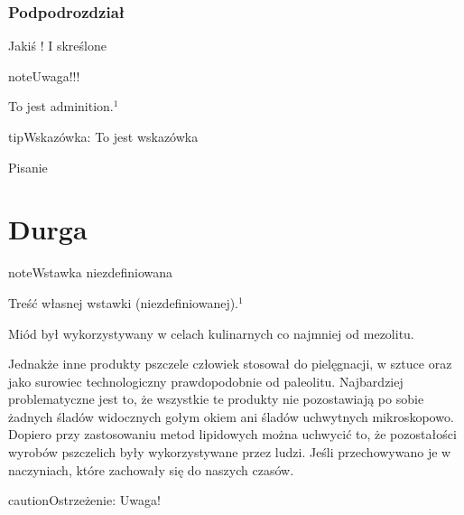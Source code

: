 \documentclass[letterpaper,10pt,polish]{sphinxmanual}
\let\sphinxpxdimen\pdfpxdimen\else\newdimen\sphinxpxdimen
\begin{document}
\subsection{Podpodrozdział}
\label{\detokenize{zrzut/index:podpodrozdzial}}
\sphinxAtStartPar
Jakiś ! I skreślone

\begin{sphinxadmonition}{note}{Uwaga!!!}

\sphinxAtStartPar
To jest adminition.$^{\text{1}}$
\end{sphinxadmonition}

\sphinxAtStartPar
{}

\begin{sphinxadmonition}{tip}{Wskazówka:}
\sphinxAtStartPar
To jest wskazówka
\end{sphinxadmonition}

\sphinxAtStartPar
Pisanie  


\chapter{Durga}
\label{\detokenize{zrzut/index:durga}}
\begin{sphinxadmonition}{note}{Wstawka niezdefiniowana}

\sphinxAtStartPar
Treść własnej wstawki (niezdefiniowanej).$^{\text{1}}$
\end{sphinxadmonition}

\sphinxAtStartPar
{}

\sphinxAtStartPar
{}

\sphinxAtStartPar
Miód był \sphinxincludegraphics[width=50\sphinxpxdimen]{{kiedy}.jpg} wykorzystywany w celach kulinarnych co najmniej od mezolitu.

\sphinxAtStartPar
Jednakże inne \sphinxincludegraphics[width=50\sphinxpxdimen]{{kiedy}.jpg} produkty pszczele człowiek stosował do pielęgnacji, w sztuce oraz jako surowiec technologiczny prawdopodobnie od paleolitu. Najbardziej problematyczne jest to, że wszystkie te produkty nie pozostawiają po sobie żadnych śladów widocznych gołym okiem ani śladów uchwytnych mikroskopowo. Dopiero przy zastosowaniu metod lipidowych można uchwycić to, że pozostałości wyrobów pszczelich były wykorzystywane przez ludzi. Jeśli przechowywano je w naczyniach, które zachowały się do naszych czasów.

\begin{sphinxadmonition}{caution}{Ostrzeżenie:}
\sphinxAtStartPar
Uwaga!
\end{sphinxadmonition}
\end{document}
